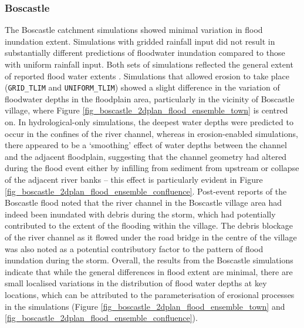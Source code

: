 \subsubsection{Boscastle}
The Boscastle catchment simulations showed minimal variation in flood inundation extent. Simulations with gridded rainfall input did not result in substantially different predictions of floodwater inundation compared to those with uniform rainfall input. Both sets of simulations reflected the general extent of reported flood water extents \citep{wallingford2005flooding}. Simulations that allowed erosion to take place (\texttt{GRID\_TLIM} and \texttt{UNIFORM\_TLIM}) showed a slight difference in the variation of floodwater depths in the floodplain area, particularly in the vicinity of Boscastle village, where Figure \ref{fig_boscastle_2dplan_flood_ensemble_town} is centred on. In hydrological-only simulations, the deepest water depths were predicted to occur in the confines of the river channel, whereas in erosion-enabled simulations, there appeared to be a `smoothing' effect of water depths between the channel and the adjacent floodplain, suggesting that the channel geometry had altered during the flood event either by infilling from sediment from upstream or collapse of the adjacent river banks -- this effect is particularly evident in Figure \ref{fig_boscastle_2dplan_flood_ensemble_confluence}. Post-event reports of the Boscastle flood noted that the river channel in the Boscastle village area had indeed been inundated with debris during the storm, which had potentially contributed to the extent of the flooding within the village. The debris blockage of the  river channel as it flowed under the road bridge in the centre of the village was also noted as a potential contributory factor to the pattern of flood inundation during the storm. Overall, the results from the Boscastle simulations indicate that while the general differences in flood extent are minimal, there are small localised variations in the distribution of flood water depths at key locations, which can be attributed to the parameterisation of erosional processes in the simulations (Figure \ref{fig_boscastle_2dplan_flood_ensemble_town} and \ref{fig_boscastle_2dplan_flood_ensemble_confluence}).

